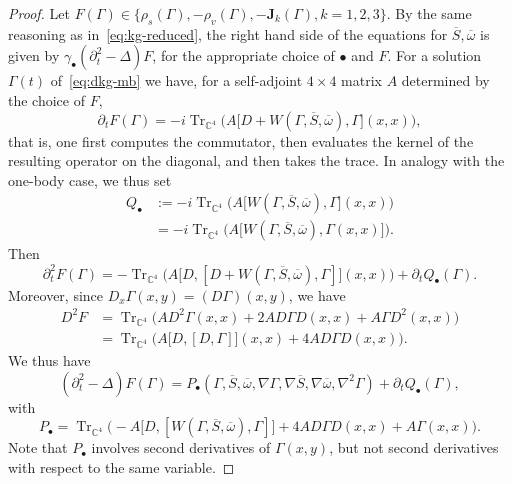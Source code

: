 \documentclass[10pt]{amsart}
\theoremstyle{definition}\newtheorem{defi}[theo]{Definition}\newtheorem{rema}[theo]{Remark}\newtheorem{exam}[theo]{Example}\newtheorem{exem}[theo]{Example}\newtheorem{nota}[theo]{Notation}
\DeclareMathOperator{\tr}{Tr}
\newcommand\C{\mathbb{C}}
\begin{document}
\begin{proof}
Let $F(\Gamma)\in \{\rho_s(\Gamma),- \rho_v(\Gamma), -{\bm J}_k(\Gamma), k=1,2, 3\}$. By the same reasoning as in~\eqref{eq:kg-reduced}, the right hand side of the equations for $\overline{S}, \overline{\omega}$ is given by $\gamma_\bullet (\partial_t^2 - \Delta)F$, for the appropriate choice of $\bullet$ and $F$. For a solution $\Gamma(t)$ of~\eqref{eq:dkg-mb} we have, for a self-adjoint $4\times 4$ matrix $A$ determined by the choice of $F$,
\begin{equation}
\partial_t F(\Gamma) = -i\tr_{\C^4}\Big(A \big[D +W(\Gamma, \overline{S}, \overline{\omega}), \Gamma\big](x,x) \Big),
\end{equation}
that is, one first computes the commutator, then evaluates the kernel of the resulting operator on the diagonal, and then takes the trace. In analogy with the one-body case, we thus set
\begin{equation}\label{eq:Q-mb-def}
\begin{split}
Q_\bullet &{:=} -i\tr_{\C^4}\Big(A \big[W(\Gamma, \overline{S}, \overline{\omega}), \Gamma\big](x,x) \Big)\\
&{=} -i\tr_{\C^4}\Big(A \big[W(\Gamma, \overline{S}, \overline{\omega}), \Gamma(x,x)\big] \Big).
\end{split}
\end{equation}
Then
\begin{equation}
\partial_t^2 F(\Gamma)= -\tr_{\C^4}\Big(A \big[D,[D +W(\Gamma, \overline{S}, \overline{\omega}), \Gamma]\big](x,x) \Big) + \partial_t Q_\bullet(\Gamma).
\end{equation}
Moreover, since $D_x \Gamma(x,y)= (D\Gamma)(x,y)$, we have
\begin{equation}
\begin{split}
D^2 F &= \tr_{\C^4}\Big(A D^2\Gamma(x,x) + 2 A D \Gamma D(x,x) + A \Gamma D^2 (x,x) \Big)\\
&=\tr_{\C^4}\Big(A \big[D,[D, \Gamma]\big](x,x) +4 A D \Gamma D(x,x)\Big).
\end{split}
\end{equation}
We thus have
\begin{equation}
\left(\partial_t^2 -\Delta\right)F(\Gamma)= P_\bullet\left(\Gamma, \overline{S}, \overline{\omega}, \nabla\Gamma, \nabla \overline{S}, \nabla \overline{\omega},\nabla^2 \Gamma\right) +\partial_t Q_\bullet(\Gamma),
\end{equation}
with
\begin{equation}
P_\bullet=\tr_{\C^4}\Big(-A \big[D,[W(\Gamma, \overline{S}, \overline{\omega}), \Gamma]\big]+4 A D \Gamma D(x,x) + A\Gamma(x,x) \Big).
\end{equation}
Note that $P_\bullet$ involves second derivatives of $\Gamma(x,y)$, but not second derivatives with respect to the same variable.


\end{proof}
\end{document}
